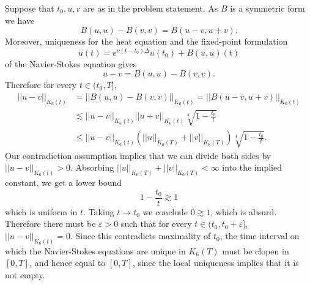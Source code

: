 \documentclass[10pt]{article}
\theoremstyle{definition}
\begin{document}
Suppose that $t_0,u,v$ are as in the problem statement.
As $B$ is a symmetric form we have
$$B(u, u) - B(v, v) = B(u - v, u + v).$$
Moreover, uniqueness for the heat equation and the fixed-point formulation
$$u(t) = e^{\nu (t - t_0)\Delta} u(t_0) + B(u, u)(t)$$
of the Navier-Stokes equation gives
$$u - v = B(u, u) - B(v, v).$$
Therefore for every $t \in (t_0, T]$,
\begin{align*}
||u - v||_{K_6(t)} &= ||B(u, u) - B(v, v)||_{K_6(t)} = ||B(u - v, u + v)||_{K_6(t)}\\
&\lesssim ||u - v||_{K_6(t)} ||u + v||_{K_6(t)} \sqrt[4]{1 - \frac{t_0}{t}}\\
&\leq ||u - v||_{K_6(t)}(||u||_{K_6(T)} + ||v||_{K_6(T)}) \sqrt[4]{1 - \frac{t_0}{t}}.
\end{align*}
Our contradiction assumption implies that we can divide both sides by $||u - v||_{K_6(t)} > 0$.
Absorbing $||u||_{K_6(T)} + ||v||_{K_6(T)} < \infty$ into the implied constant, we get a lower bound
$$1 - \frac{t_0}{t} \gtrsim 1$$
which is uniform in $t$. Taking $t \to t_0$ we conclude $0 \gtrsim 1$, which is absurd.
Therefore there must be $\varepsilon > 0$ such that for every $t \in (t_0, t_0 + \varepsilon]$, $||u - v||_{K_6(t)} = 0$.
Since this contradicts maximality of $t_0$, the time interval on which the Navier-Stokes equations are unique in $K_6(T)$ must be clopen in $[0, T]$, and hence equal to $[0, T]$, since the local uniqueness implies that it is not empty.
\end{document}
